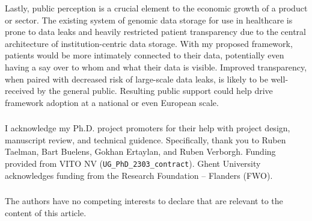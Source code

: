 \documentclass[runningheads]{llncs}
\begin{document}
Lastly, public perception is a crucial element to the economic growth of a product or sector. 
The existing system of genomic data storage for use in healthcare is prone to data leaks and heavily restricted patient transparency due to the central architecture of institution-centric data storage. 
With my proposed framework, patients would be more intimately connected to their data, potentially even having a say over to whom and what their data is visible. 
Improved transparency, when paired with decreased risk of large-scale data leaks, is likely to be well-received by the general public. 
Resulting public support could help drive framework adoption at a national or even European scale. 


\subsubsection{\ackname} 
I acknowledge my Ph.D. project promoters for their help with project design, manuscript review, and technical guidence.
Specifically, thank you to Ruben Taelman, Bart Buelens, Gokhan Ertaylan, and Ruben Verborgh.
Funding provided from VITO NV (\verb|UG_PhD_2303_contract|). 
Ghent University acknowledges funding from the Research Foundation – Flanders (FWO).
\subsubsection{\discintname} The authors have no competing interests to declare that are relevant to the content of this article.



\end{document}
